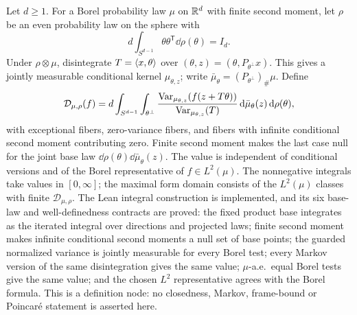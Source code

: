 \begin{definition}
  \label{def:conditional-fiber-form}
  \leanok
  Let $d\ge1$.  For a Borel probability law $\mu$ on $\mathbb{R}^d$ with finite second moment, let $\rho$ be an
  even probability law on the sphere with
  \[
    d\int_{S^{d-1}}\theta\theta^{\mathsf T}\dd\rho(\theta)=I_d.
  \]
  Under $\rho\otimes\mu$, disintegrate $T=\langle x,\theta\rangle$ over
  $(\theta,z)=(\theta,P_{\theta^\perp}x)$.  This gives a jointly measurable conditional kernel
  $\mu_{\theta,z}$; write $\bar\mu_\theta=(P_{\theta^\perp})_\#\mu$.  Define
  \[
    \mathcal D_{\mu,\rho}(f)
    =d\int_{S^{d-1}}\int_{\theta^\perp}
      \frac{\operatorname{Var}_{\mu_{\theta,z}}(f(z+T\theta))}
           {\operatorname{Var}_{\mu_{\theta,z}}(T)}
      \,\mathrm d\bar\mu_\theta(z)\,\mathrm d\rho(\theta),
  \]
  with exceptional fibers, zero-variance fibers, and fibers with infinite conditional second
  moment contributing zero.
  Finite second moment makes the last case null for the joint base law
  $\dd\rho(\theta)\dd\bar\mu_\theta(z)$.  The value is independent of conditional versions and
  of the Borel representative of $f\in L^2(\mu)$.  The nonnegative integrals take values
  in $[0,\infty]$; the maximal form domain consists of the $L^2(\mu)$ classes with finite
  $\mathcal D_{\mu,\rho}$.
  The Lean integral construction is implemented, and its six base-law and well-definedness
  contracts are proved: the fixed product base integrates as the iterated integral over
  directions and projected laws; finite second moment makes infinite conditional second
  moments a null set of base points; the guarded normalized variance is jointly measurable
  for every Borel test; every Markov version of the same disintegration gives the same value;
  $\mu$-a.e.\ equal Borel tests give the same value; and the chosen $L^2$ representative agrees
  with the Borel formula.  This is a definition node: no closedness, Markov, frame-bound or
  Poincar\'e statement is asserted here.
\end{definition}

